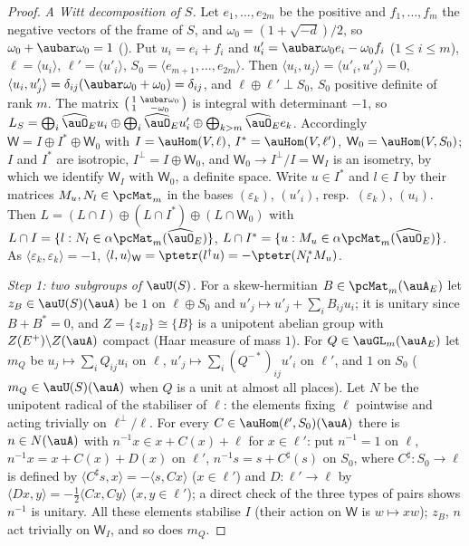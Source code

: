 \documentclass[10pt]{amsart}
\theoremstyle{definition}
\theoremstyle{remark}
\begin{document}
\begin{proof}
\emph{A Witt decomposition of $S$.} Let $e_1,\dots,e_{2m}$ be the positive and $f_1,\dots,f_m$ the negative
vectors of the frame of $S$, and $\omega_0=(1+\sqrt{-d})/2$, so $\omega_0+\aubar\omega_0=1$
({\cite[\S5.1.1]{P49}}). Put $u_i=e_i+f_i$ and $u'_i=\aubar\omega_0e_i-\omega_0f_i$ ($1\le i\le m$),
$\ell=\langle u_i\rangle$, $\ell'=\langle u'_i\rangle$, $S_0=\langle e_{m+1},\dots,e_{2m}\rangle$. Then
$\langle u_i,u_j\rangle=\langle u'_i,u'_j\rangle=0$, $\langle u_i,u'_j\rangle=\delta_{ij}(\aubar\omega_0+\omega_0)
=\delta_{ij}$, and $\ell\oplus\ell'\perp S_0$, $S_0$ positive definite of rank $m$. The matrix
$\bigl(\begin{smallmatrix}1&\aubar\omega_0\\1&-\omega_0\end{smallmatrix}\bigr)$ is integral with determinant
$-1$, so $L_S=\bigoplus_i\widehat\auO_Eu_i\oplus\bigoplus_i\widehat\auO_Eu'_i\oplus\bigoplus_{k>m}
\widehat\auO_Ee_k$. Accordingly $\mathsf W=I\oplus I^*\oplus\mathsf W_0$ with $I=\auHom(V,\ell)$,
$I^*=\auHom(V,\ell')$, $\mathsf W_0=\auHom(V,S_0)$; $I$ and $I^*$ are isotropic, $I^\perp=I\oplus\mathsf W_0$,
and $\mathsf W_0\to I^\perp/I=\mathsf W_I$ is an isometry, by which we identify $\mathsf W_I$ with
$\mathsf W_0$, a definite space. Write $u\in I^*$ and $l\in I$ by their matrices $M_u,N_l\in\pcMat_m$ in
the bases $(\varepsilon_k)$, $(u'_i)$, resp.\ $(\varepsilon_k)$, $(u_i)$. Then
$L=(L\cap I)\oplus(L\cap I^*)\oplus(L\cap\mathsf W_0)$ with $L\cap I=\{l:N_l\in\alpha\pcMat_m(\widehat\auO_E)\}$,
$L\cap I^*=\{u:M_u\in\alpha\pcMat_m(\widehat\auO_E)\}$. As $\langle\varepsilon_k,\varepsilon_k\rangle=-1$,
$\langle l,u\rangle_{\mathsf W}=\ptetr(l^\dagger u)=-\ptetr(N_l^*M_u)$.

\emph{Step 1: two subgroups of $\auU(S)$.} For a skew-hermitian $B\in\pcMat_m(\auA_E)$ let $z_B\in\auU(S)(\auA)$
be $1$ on $\ell\oplus S_0$ and $u'_j\mapsto u'_j+\sum_iB_{ij}u_i$; it is unitary since $B+B^*=0$, and
$Z=\{z_B\}\cong\{B\}$ is a unipotent abelian group with $Z(E^+)\backslash Z(\auA)$ compact (Haar measure of
mass $1$). For $Q\in\auGL_m(\auA_E)$ let $m_Q$ be $u_j\mapsto\sum_iQ_{ij}u_i$ on $\ell$,
$u'_j\mapsto\sum_i(Q^{-*})_{ij}u'_i$ on $\ell'$, and $1$ on $S_0$ ($m_Q\in\auU(S)(\auA)$ when $Q$ is a unit at
almost all places). Let $N$ be the unipotent radical of the stabiliser of $\ell$: the elements fixing $\ell$
pointwise and acting trivially on $\ell^\perp/\ell$. For every $C\in\auHom(\ell',S_0)(\auA)$ there is $n\in
N(\auA)$ with $n^{-1}x\in x+C(x)+\ell$ for $x\in\ell'$: put $n^{-1}=1$ on $\ell$,
$n^{-1}x=x+C(x)+D(x)$ on $\ell'$, $n^{-1}s=s+C^\sharp(s)$ on $S_0$, where $C^\sharp\colon S_0\to\ell$ is
defined by $\langle C^\sharp s,x\rangle=-\langle s,Cx\rangle$ ($x\in\ell'$) and $D\colon\ell'\to\ell$ by
$\langle D x,y\rangle=-\tfrac12\langle Cx,Cy\rangle$ ($x,y\in\ell'$); a direct check of the three types of
pairs shows $n^{-1}$ is unitary. All these elements stabilise $I$ (their action on $\mathsf W$ is $w\mapsto
xw$); $z_B$, $n$ act trivially on $\mathsf W_I$, and so does $m_Q$.


\end{proof}
\end{document}

